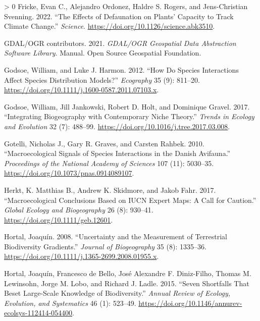 \documentclass[10pt,oneside]{article}
\newlength{\cslhangindent}
\newenvironment{CSLReferences}[3] %
 {%
  \setlength{\parindent}{0pt}
  \ifodd #1 \everypar{\setlength{\hangindent}{\cslhangindent}}\ignorespaces\fi
  \ifnum #2 > 0
  \setlength{\parskip}{#2\baselineskip}
  \fi
 }%
 {}
\begin{document}
\begin{CSLReferences}{1}{0}
\leavevmode\hypertarget{ref-Fricke2022EffDef}{}%
Fricke, Evan C., Alejandro Ordonez, Haldre S. Rogers, and Jens-Christian
Svenning. 2022. {``The Effects of Defaunation on Plants' Capacity to
Track Climate Change.''} \emph{Science}.
\url{https://doi.org/10.1126/science.abk3510}.

\leavevmode\hypertarget{ref-GDALux2fOGRcontributors2021GdaOgr}{}%
GDAL/OGR contributors. 2021. \emph{GDAL/OGR Geospatial Data Abstraction
Software Library}. Manual. Open Source Geospatial Foundation.

\leavevmode\hypertarget{ref-Godsoe2012HowSpe}{}%
Godsoe, William, and Luke J. Harmon. 2012. {``How Do Species
Interactions Affect Species Distribution Models?''} \emph{Ecography} 35
(9): 811--20. \url{https://doi.org/10.1111/j.1600-0587.2011.07103.x}.

\leavevmode\hypertarget{ref-Godsoe2017IntBio}{}%
Godsoe, William, Jill Jankowski, Robert D. Holt, and Dominique Gravel.
2017. {``Integrating Biogeography with Contemporary Niche Theory.''}
\emph{Trends in Ecology and Evolution} 32 (7): 488--99.
\url{https://doi.org/10.1016/j.tree.2017.03.008}.

\leavevmode\hypertarget{ref-Gotelli2010MacSig}{}%
Gotelli, Nicholas J., Gary R. Graves, and Carsten Rahbek. 2010.
{``Macroecological Signals of Species Interactions in the Danish
Avifauna.''} \emph{Proceedings of the National Academy of Sciences} 107
(11): 5030--35. \url{https://doi.org/10.1073/pnas.0914089107}.

\leavevmode\hypertarget{ref-Herkt2017MacCon}{}%
Herkt, K. Matthias B., Andrew K. Skidmore, and Jakob Fahr. 2017.
{``Macroecological Conclusions Based on IUCN Expert Maps: A Call for
Caution.''} \emph{Global Ecology and Biogeography} 26 (8): 930--41.
\url{https://doi.org/10.1111/geb.12601}.

\leavevmode\hypertarget{ref-Hortal2008UncMea}{}%
Hortal, Joaquín. 2008. {``Uncertainty and the Measurement of Terrestrial
Biodiversity Gradients.''} \emph{Journal of Biogeography} 35 (8):
1335--36. \url{https://doi.org/10.1111/j.1365-2699.2008.01955.x}.

\leavevmode\hypertarget{ref-Hortal2015SevSho}{}%
Hortal, Joaquín, Francesco de Bello, José Alexandre F. Diniz-Filho,
Thomas M. Lewinsohn, Jorge M. Lobo, and Richard J. Ladle. 2015. {``Seven
Shortfalls That Beset Large-Scale Knowledge of Biodiversity.''}
\emph{Annual Review of Ecology, Evolution, and Systematics} 46 (1):
523--49. \url{https://doi.org/10.1146/annurev-ecolsys-112414-054400}.


\end{CSLReferences}
\end{document}
